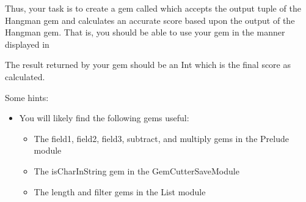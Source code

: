 Thus, your task is to create a gem called  which accepts the output tuple of the Hangman gem and calculates an accurate score based upon the output of the Hangman gem.  That is, you should be able to use your gem in the manner displayed in 


The result returned by your  gem should be an Int which is the final score as calculated.

Some hints:

\begin{itemize}
	\item You will likely find the following gems useful: 
	\begin{itemize}
		\item The field1, field2, field3, subtract, and multiply gems in the Prelude module
		\item The isCharInString gem in the GemCutterSaveModule
		\item The length and filter gems in the List module
	\end{itemize}
\end{itemize}